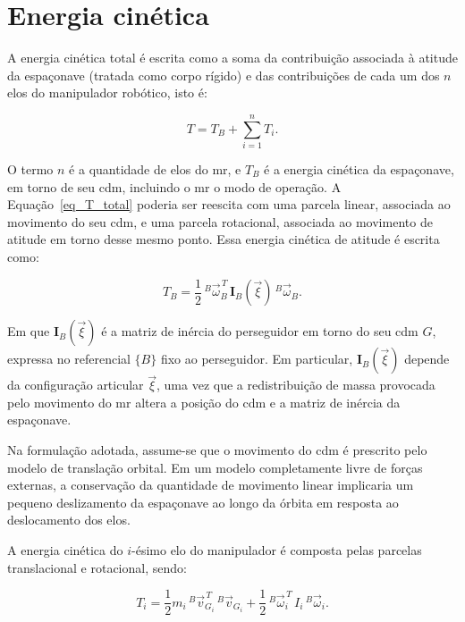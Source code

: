 \section{Energia cinética}
\label{sec_dinAcoplada_energia_cinetica}

A energia cinética total é escrita como a soma da contribuição associada à atitude da espaçonave (tratada como corpo rígido) e das contribuições de cada um dos $n$ elos do manipulador robótico, isto é:


\begin{equation}
T = T_{B} + \sum_{i=1}^{n} T_{i}.
\label{eq_T_total}
\end{equation}

O termo $n$ é a quantidade de elos do \gls{mr}, e $T_B$ é a energia cinética da espaçonave, em torno de seu \gls{cdm}, incluindo o \gls{mr} o modo de operação.
A Equação~\eqref{eq_T_total} poderia ser reescita com uma parcela linear, associada ao movimento do seu \gls{cdm}, e uma parcela rotacional, associada ao movimento de atitude em torno desse mesmo ponto.
Essa energia cinética de atitude é escrita como:

\begin{equation}
T_{B} =
\frac{1}{2}\, {}^{B}\!\vec{\omega}_{B}^{\,T}\,\mathbf{I}_B(\vec{\xi})\,{}^{B}\!\vec{\omega}_{B}.
\label{eq_TB}
\end{equation}

Em que $\mathbf{I}_B(\vec{\xi})$ é a matriz de inércia do perseguidor em torno do seu \gls{cdm} $G$, expressa no referencial $\{B\}$ fixo ao perseguidor.
Em particular, $\mathbf{I}_B(\vec{\xi})$ depende da configuração articular $\vec{\xi}$, uma vez que a redistribuição de massa provocada pelo movimento do \gls{mr} altera a posição do \gls{cdm} e a matriz de inércia da espaçonave.

Na formulação adotada, assume-se que o movimento do \gls{cdm} é prescrito pelo modelo de translação orbital.
Em um modelo completamente livre de forças externas, a conservação da quantidade de movimento linear implicaria um pequeno deslizamento da espaçonave ao longo da órbita em resposta ao deslocamento dos elos.


A energia cinética do $i$-ésimo elo do manipulador é composta pelas parcelas translacional e rotacional, sendo:

\begin{equation}
T_i =
\frac{1}{2} m_i\, {}^{B}\!\vec v_{G_i}^{\,T}\,{}^{B}\!\vec v_{G_i}
+
\frac{1}{2}\, {}^{B}\!\vec\omega_i^{\,T}\, I_i\, {}^{B}\!\vec\omega_i.
\label{eq_Ti}
\end{equation}

